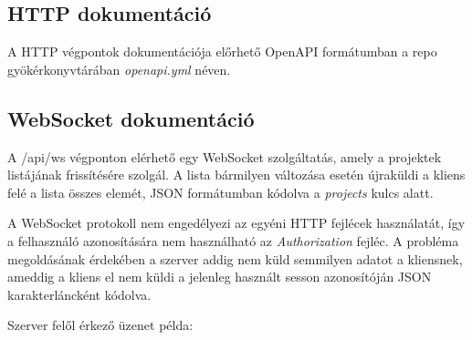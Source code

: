 \subsection{HTTP dokumentáció}
A HTTP végpontok dokumentációja előrhető OpenAPI formátumban a repo gyökérkonyvtárában \emph{openapi.yml} néven.

\subsection{WebSocket dokumentáció}
A /api/ws végponton elérhető egy WebSocket szolgáltatás, amely a projektek listájának frissítésére szolgál. A lista bármilyen változása esetén újraküldi a kliens felé a lista összes elemét, JSON formátumban kódolva a \emph{projects} kulcs alatt.

A WebSocket protokoll nem engedélyezi az egyéni HTTP fejlécek használatát, így a felhasználó azonosítására nem használható az \emph{Authorization} fejléc. A probléma megoldásának érdekében a szerver addig nem küld semmilyen adatot a kliensnek, ameddig a kliens el nem küldi a jelenleg használt sesson azonosítóján JSON karakterláncként kódolva.

Szerver felől érkező üzenet példa:
\begin{lstlisting}
      
\end{lstlisting}